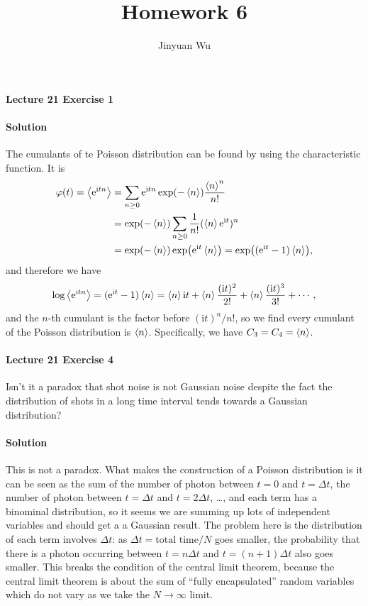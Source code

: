 \documentclass[hyperref, a4paper]{article}
\title{Homework 6}
\author{Jinyuan Wu}
\newcommand*{\ii}{\mathrm{i}}
\newcommand*{\ee}{\mathrm{e}}
\begin{document}
    
\maketitle

\paragraph{Lecture 21 Exercise 1}

\paragraph{Solution} The cumulants of te Poisson distribution can be found by 
using the characteristic function.
It is 
\begin{equation}
    \begin{aligned}
        \varphi(t) = \expval{\ee^{\ii t n}} &= 
        \sum_{n \geq 0} \ee^{\ii t n} \exp(-\expval{n}) \frac{\expval{n}^n}{n!}  \\
        &= \exp(-\expval{n}) \sum_{n \geq 0} \frac{1}{n!} (\expval{n} \ee^{\ii t})^n  \\
        &= \exp(-\expval{n}) \exp(\ee^{\ii t} \expval{n}) 
        = \exp((\ee^{\ii t} - 1) \expval{n}),
    \end{aligned}
\end{equation}
and therefore we have 
\begin{equation}
    \log \expval{\ee^{\ii t n}} = (\ee^{\ii t} - 1) \expval{n} = 
    \expval{n} \ii t  + \expval{n} \frac{(\ii t)^2}{2!} + \expval{n} \frac{(\ii t)^3}{3!} + \cdots,
\end{equation}
and the $n$-th cumulant is the factor before $(\ii t)^n / n!$,
so we find every cumulant of the Poisson distribution is $\expval{n}$.
Specifically, we have $C_3 = C_4 = \expval{n}$.

\paragraph{Lecture 21 Exercise 4} Isn't it a paradox that shot noise is not Gaussian noise despite the fact the distribution of shots in a long time interval tends towards a Gaussian distribution?

\paragraph{Solution} This is not a paradox.
What makes the construction of a Poisson distribution is 
it can be seen as the sum of the number of photon between $t=0$ and $t = \Delta t$,
the number of photon between $t = \Delta t$ and $t = 2 \Delta t$, \dots,
and each term has a binominal distribution,
so it seems we are summing up lots of independent variables 
and should get a a Gaussian result.
The problem here is the distribution of each term involves $\Delta t$:
as $\Delta t = \text{total time} / N$ goes smaller,
the probability that there is a photon occurring between $t = n \Delta t$ and $t = (n+1) \Delta t$ 
also goes smaller.
This breaks the condition of the central limit theorem,
because the central limit theorem is about the sum 
of ``fully encapsulated'' random variables which do not vary as we take the $N \to \infty$ limit.
\end{document}
